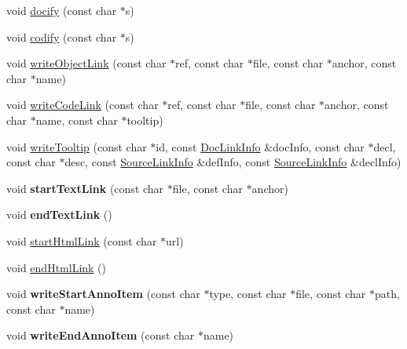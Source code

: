\begin{DoxyCompactItemize}
\item 
void \hyperlink{class_output_list_af7ffb65da6beaf5adf9c63da246dc694}{docify} (const char $\ast$s)
\item 
void \hyperlink{class_output_list_ad58b50196a8176a68df41aabcaf6a8b7}{codify} (const char $\ast$s)
\item 
void \hyperlink{class_output_list_a78d7e4718290246f77043de949c83081}{write\-Object\-Link} (const char $\ast$ref, const char $\ast$file, const char $\ast$anchor, const char $\ast$name)
\item 
void \hyperlink{class_output_list_ab3866da052a840c400b4990dd2ddf61b}{write\-Code\-Link} (const char $\ast$ref, const char $\ast$file, const char $\ast$anchor, const char $\ast$name, const char $\ast$tooltip)
\item 
void \hyperlink{class_output_list_acc6f74ac2670196668c05d4156eec872}{write\-Tooltip} (const char $\ast$id, const \hyperlink{struct_doc_link_info}{Doc\-Link\-Info} \&doc\-Info, const char $\ast$decl, const char $\ast$desc, const \hyperlink{struct_source_link_info}{Source\-Link\-Info} \&def\-Info, const \hyperlink{struct_source_link_info}{Source\-Link\-Info} \&decl\-Info)
\item 
\hypertarget{class_output_list_a7eb8349051c2985097c470a8ad97fdca}{void {\bfseries start\-Text\-Link} (const char $\ast$file, const char $\ast$anchor)}\label{class_output_list_a7eb8349051c2985097c470a8ad97fdca}

\item 
\hypertarget{class_output_list_a98515ca43c32f8bc616925eb3c683b6e}{void {\bfseries end\-Text\-Link} ()}\label{class_output_list_a98515ca43c32f8bc616925eb3c683b6e}

\item 
void \hyperlink{class_output_list_a0746b9c06743e1d4fe527b8317457da1}{start\-Html\-Link} (const char $\ast$url)
\item 
void \hyperlink{class_output_list_ac2ba450d319270e186e436167c8609ce}{end\-Html\-Link} ()
\item 
\hypertarget{class_output_list_a33695af2d50fc8c46a5ba1eb806e7ab5}{void {\bfseries write\-Start\-Anno\-Item} (const char $\ast$type, const char $\ast$file, const char $\ast$path, const char $\ast$name)}\label{class_output_list_a33695af2d50fc8c46a5ba1eb806e7ab5}

\item 
\hypertarget{class_output_list_aab3b8288c28235bcf5a4b99a84a8c87a}{void {\bfseries write\-End\-Anno\-Item} (const char $\ast$name)}\label{class_output_list_aab3b8288c28235bcf5a4b99a84a8c87a}


\end{DoxyCompactItemize}
